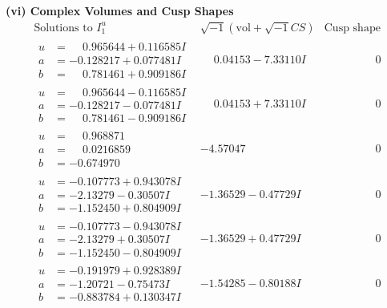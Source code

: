 \documentclass[1p]{elsarticle_modified}
\theoremstyle{definition}
\newcommand{\I}{\sqrt{-1}}
\begin{document}
\newpage\flushleft \textbf{(vi) Complex Volumes and Cusp Shapes}
$$\begin{array}{c|c|c}  
\text{Solutions to }I^u_{1}& \I (\text{vol} + \sqrt{-1}CS) & \text{Cusp shape}\\
 \hline 
\begin{aligned}
u &= \phantom{-}0.965644 + 0.116585 I \\
a &= -0.128217 + 0.077481 I \\
b &= \phantom{-}0.781461 + 0.909186 I\end{aligned}
 & \phantom{-}0.04153 - 7.33110 I & \phantom{-0.000000 } 0 \\ \hline\begin{aligned}
u &= \phantom{-}0.965644 - 0.116585 I \\
a &= -0.128217 - 0.077481 I \\
b &= \phantom{-}0.781461 - 0.909186 I\end{aligned}
 & \phantom{-}0.04153 + 7.33110 I & \phantom{-0.000000 } 0 \\ \hline\begin{aligned}
u &= \phantom{-}0.968871\phantom{ +0.000000I} \\
a &= \phantom{-}0.0216859\phantom{ +0.000000I} \\
b &= -0.674970\phantom{ +0.000000I}\end{aligned}
 & -4.57047\phantom{ +0.000000I} & \phantom{-0.000000 } 0 \\ \hline\begin{aligned}
u &= -0.107773 + 0.943078 I \\
a &= -2.13279 - 0.30507 I \\
b &= -1.152450 + 0.804909 I\end{aligned}
 & -1.36529 - 0.47729 I & \phantom{-0.000000 } 0 \\ \hline\begin{aligned}
u &= -0.107773 - 0.943078 I \\
a &= -2.13279 + 0.30507 I \\
b &= -1.152450 - 0.804909 I\end{aligned}
 & -1.36529 + 0.47729 I & \phantom{-0.000000 } 0 \\ \hline\begin{aligned}
u &= -0.191979 + 0.928389 I \\
a &= -1.20721 - 0.75473 I \\
b &= -0.883784 + 0.130347 I\end{aligned}
 & -1.54285 - 0.80188 I & \phantom{-0.000000 } 0 \\ \hline\begin{aligned}

\end{aligned}
\end{array}$$
\end{document}
